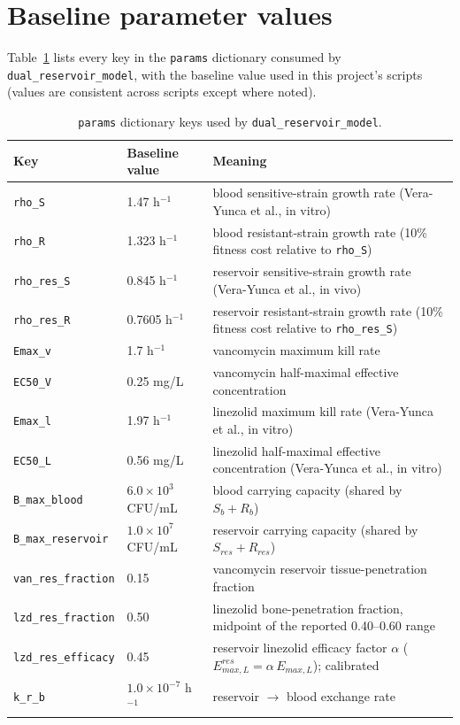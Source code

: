 \documentclass[11pt]{article}
\begin{document}
\section{Baseline parameter values}

Table~\ref{tab:params} lists every key in the \texttt{params} dictionary
consumed by \texttt{dual\_reservoir\_model}, with the baseline value used
in this project's scripts (values are consistent across scripts except
where noted).

\begin{table}[H]
\centering
\small
\renewcommand{\arraystretch}{1.15}
\caption{\texttt{params} dictionary keys used by \texttt{dual\_reservoir\_model}.}
\vspace{0.5cm}
\begin{tabularx}{\textwidth}{l l X}
\hline
\textbf{Key} & \textbf{Baseline value} & \textbf{Meaning} \\
\hline
\texttt{rho\_S} & 1.47 h$^{-1}$ & blood sensitive-strain growth rate (Vera-Yunca et al., in vitro) \\
\texttt{rho\_R} & 1.323 h$^{-1}$ & blood resistant-strain growth rate (10\% fitness cost relative to \texttt{rho\_S}) \\
\texttt{rho\_res\_S} & 0.845 h$^{-1}$ & reservoir sensitive-strain growth rate (Vera-Yunca et al., in vivo) \\
\texttt{rho\_res\_R} & 0.7605 h$^{-1}$ & reservoir resistant-strain growth rate (10\% fitness cost relative to \texttt{rho\_res\_S}) \\
\texttt{Emax\_v} & 1.7 h$^{-1}$ & vancomycin maximum kill rate \\
\texttt{EC50\_V} & 0.25 mg/L & vancomycin half-maximal effective concentration \\
\texttt{Emax\_l} & 1.97 h$^{-1}$ & linezolid maximum kill rate (Vera-Yunca et al., in vitro) \\
\texttt{EC50\_L} & 0.56 mg/L & linezolid half-maximal effective concentration (Vera-Yunca et al., in vitro) \\
\texttt{B\_max\_blood} & $6.0\times10^3$ CFU/mL & blood carrying capacity (shared by $S_b+R_b$) \\
\texttt{B\_max\_reservoir} & $1.0\times10^7$ CFU/mL & reservoir carrying capacity (shared by $S_{res}+R_{res}$) \\
\texttt{van\_res\_fraction} & 0.15 & vancomycin reservoir tissue-penetration fraction \\
\texttt{lzd\_res\_fraction} & 0.50 & linezolid bone-penetration fraction, midpoint of the reported 0.40--0.60 range \\
\texttt{lzd\_res\_efficacy} & 0.45 & reservoir linezolid efficacy factor $\alpha$ ($E_{max,L}^{res} = \alpha\,E_{max,L}$); calibrated \\
\texttt{k\_r\_b} & $1.0\times10^{-7}$ h$^{-1}$ & reservoir $\to$ blood exchange rate \\
\hline
\end{tabularx}
\label{tab:params}
\end{table}
\end{document}
